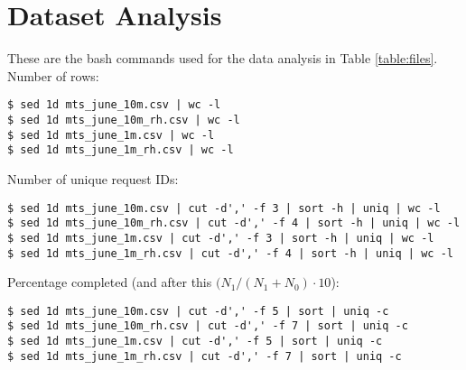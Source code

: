 \appendix

\chapter{Dataset Analysis}\label{app:dataset}

These are the bash commands used for the data analysis in Table
\ref{table:files}.\\

\noindent Number of rows:
\begin{verbatim}
$ sed 1d mts_june_10m.csv | wc -l
$ sed 1d mts_june_10m_rh.csv | wc -l
$ sed 1d mts_june_1m.csv | wc -l
$ sed 1d mts_june_1m_rh.csv | wc -l
\end{verbatim}


\noindent Number of unique request IDs:
\begin{verbatim}
$ sed 1d mts_june_10m.csv | cut -d',' -f 3 | sort -h | uniq | wc -l
$ sed 1d mts_june_10m_rh.csv | cut -d',' -f 4 | sort -h | uniq | wc -l
$ sed 1d mts_june_1m.csv | cut -d',' -f 3 | sort -h | uniq | wc -l
$ sed 1d mts_june_1m_rh.csv | cut -d',' -f 4 | sort -h | uniq | wc -l
\end{verbatim}

\noindent Percentage completed (and after this $(N_{1} / (N_{1} + N_{0}) \cdot 10$):
\begin{verbatim}
$ sed 1d mts_june_10m.csv | cut -d',' -f 5 | sort | uniq -c
$ sed 1d mts_june_10m_rh.csv | cut -d',' -f 7 | sort | uniq -c
$ sed 1d mts_june_1m.csv | cut -d',' -f 5 | sort | uniq -c
$ sed 1d mts_june_1m_rh.csv | cut -d',' -f 7 | sort | uniq -c
\end{verbatim}

